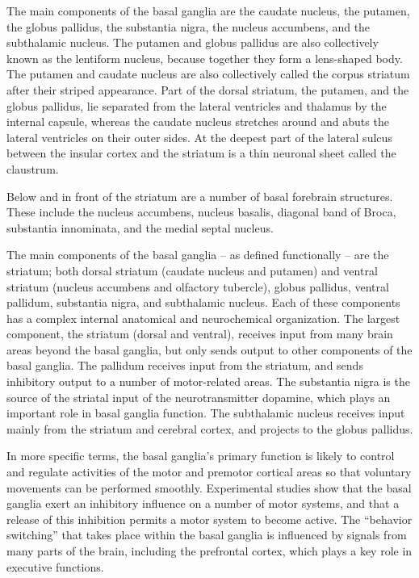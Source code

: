 \documentclass[]{book}
\begin{document}
The main components of the basal ganglia are the caudate nucleus, the putamen, the globus pallidus, the substantia nigra, the nucleus accumbens, and the subthalamic nucleus. The putamen and globus pallidus are also collectively known as the lentiform nucleus, because together they form a lens-shaped body. The putamen and caudate nucleus are also collectively called the corpus striatum after their striped appearance. Part of the dorsal striatum, the putamen, and the globus pallidus, lie separated from the lateral ventricles and thalamus by the internal capsule, whereas the caudate nucleus stretches around and abuts the lateral ventricles on their outer sides. At the deepest part of the lateral sulcus between the insular cortex and the striatum is a thin neuronal sheet called the claustrum.

Below and in front of the striatum are a number of basal forebrain structures. These include the nucleus accumbens, nucleus basalis, diagonal band of Broca, substantia innominata, and the medial septal nucleus.

The main components of the basal ganglia -- as defined functionally -- are the striatum; both dorsal striatum (caudate nucleus and putamen) and ventral striatum (nucleus accumbens and olfactory tubercle), globus pallidus, ventral pallidum, substantia nigra, and subthalamic nucleus. Each of these components has a complex internal anatomical and neurochemical organization. The largest component, the striatum (dorsal and ventral), receives input from many brain areas beyond the basal ganglia, but only sends output to other components of the basal ganglia. The pallidum receives input from the striatum, and sends inhibitory output to a number of motor-related areas. The substantia nigra is the source of the striatal input of the neurotransmitter dopamine, which plays an important role in basal ganglia function. The subthalamic nucleus receives input mainly from the striatum and cerebral cortex, and projects to the globus pallidus.

In more specific terms, the basal ganglia's primary function is likely to control and regulate activities of the motor and premotor cortical areas so that voluntary movements can be performed smoothly. Experimental studies show that the basal ganglia exert an inhibitory influence on a number of motor systems, and that a release of this inhibition permits a motor system to become active. The ``behavior switching'' that takes place within the basal ganglia is influenced by signals from many parts of the brain, including the prefrontal cortex, which plays a key role in executive functions.
\end{document}
